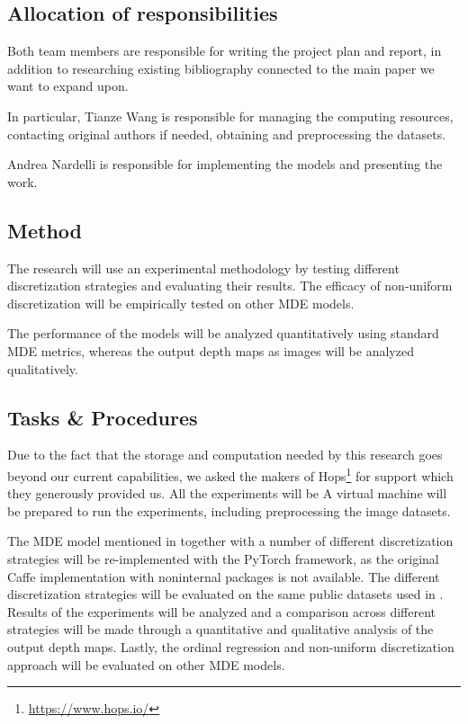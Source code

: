 \documentclass[12pt,twoside]{article}
\begin{document}
\subsection{Allocation of responsibilities}
Both team members are responsible for writing the project plan and report, in addition to researching existing bibliography connected to the main paper we want to expand upon.

In particular, Tianze Wang is responsible for managing the computing resources, contacting original authors if needed, obtaining and preprocessing the datasets.

Andrea Nardelli is responsible for implementing the models and presenting the work.

\subsection{Method}
The research will use an experimental methodology by testing different discretization strategies and evaluating their results. The efficacy of non-uniform discretization will be empirically tested on other MDE models.

The performance of the models will be analyzed quantitatively using standard MDE metrics, whereas the output depth maps as images will be analyzed qualitatively.

\subsection{Tasks \& Procedures}
Due to the fact that the storage and computation needed by this research goes beyond our current capabilities, we asked the makers of Hops\footnote{\url{https://www.hops.io/}} for support which they generously provided us. 
All the experiments will be A virtual machine will be prepared to run the experiments, including preprocessing the image datasets.

The MDE model mentioned in \cite{huan_fu_deep_2018} together with a number of different discretization strategies will be re-implemented with the PyTorch framework, as the original Caffe implementation with noninternal packages is not available. The different discretization strategies will be evaluated on the same public datasets used in \cite{huan_fu_deep_2018}. Results of the experiments will be analyzed and a comparison across different strategies will be made through a quantitative and qualitative analysis of the output depth maps. Lastly, the ordinal regression and non-uniform discretization approach will be evaluated on other MDE models.
\end{document}
